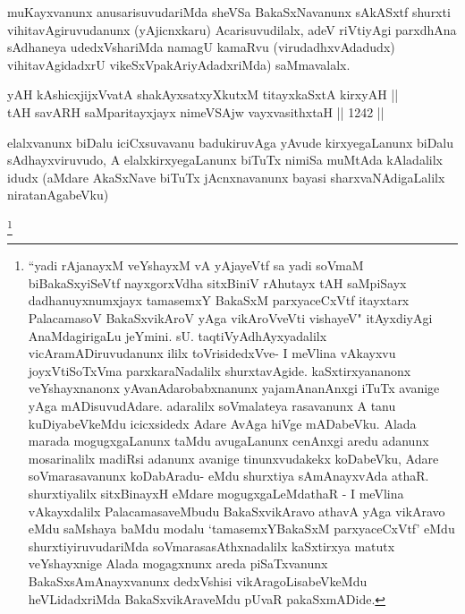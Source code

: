 \begin{artha}
muKayxvanunx anusarisuvudariMda sheVSa BakaSxNavanunx sAkASxtf shurxti vihitavAgiruvudanunx (yAjicnxkaru) Acarisuvudilalx, adeV riVtiyAgi parxdhAna sAdhaneya udedxVshariMda namagU kamaRvu (virudadhxvAdadudx) vihitavAgidadxrU vikeSxVpakAriyAdadxriMda) saMmavalalx.
\end{artha}


\begin{shl}
yAH kAshicxjijxVvatA shakAyxsatxyXkutxM titayxkaSxtA kirxyAH || \\
tAH savARH saMparitayxjayx nimeVSAjw vayxvasithxtaH \hfill || 1242 ||  
\end{shl}

\begin{artha}
elalxvanunx biDalu iciCxsuvavanu badukiruvAga yAvude kirxyegaLanunx biDalu sAdhayxviruvudo, A elalxkirxyegaLanunx biTuTx nimiSa muMtAda kAladalilx idudx (aMdare AkaSxNave biTuTx jAcnxnavanunx bayasi sharxvaNAdigaLalilx niratanAgabeVku)
\end{artha}

\begin{artha}
\footnote{``yadi rAjanayxM veYshayxM vA yAjayeVtf sa yadi soVmaM biBakaSxyiSeVtf nayxgorxVdha sitxBiniV rAhutayx tAH saMpiSayx dadhanuyxnumxjayx tamasemxY BakaSxM parxyaceCxVtf itayxtarx PalacamasoV BakaSxvikAroV yAga vikAroVveVti vishayeV" itAyxdiyAgi AnaMdagirigaLu jeYmini. sU. taqtiVyAdhAyxyadalilx vicAramADiruvudanunx ililx toVrisidedxVve- I meVlina vAkayxvu joyxVtiSoTxVma parxkaraNadalilx shurxtavAgide. kaSxtirxyananonx veYshayxnanonx yAvanAdarobabxnanunx yajamAnanAnxgi iTuTx avanige yAga mADisuvudAdare. adaralilx soVmalateya rasavanunx A tanu kuDiyabeVkeMdu icicxsidedx Adare AvAga hiVge mADabeVku. Alada marada mogugxgaLanunx taMdu avugaLanunx cenAnxgi aredu adanunx mosarinalilx madiRsi adanunx avanige tinunxvudakekx koDabeVku, Adare soVmarasavanunx koDabAradu- eMdu shurxtiya sAmAnayxvAda athaR. shurxtiyalilx sitxBinayxH eMdare mogugxgaLeMdathaR - I meVlina vAkayxdalilx PalacamasaveMbudu BakaSxvikAravo athavA yAga vikAravo eMdu saMshaya baMdu modalu `tamasemxYBakaSxM parxyaceCxVtf' eMdu shurxtiyiruvudariMda soVmarasasAthxnadalilx kaSxtirxya matutx veYshayxnige Alada mogagxnunx areda piSaTxvanunx BakaSxsAmAnayxvanunx dedxVshisi vikAragoLisabeVkeMdu heVLidadxriMda BakaSxvikAraveMdu pUvaR pakaSxmADide.}
\end{artha}

